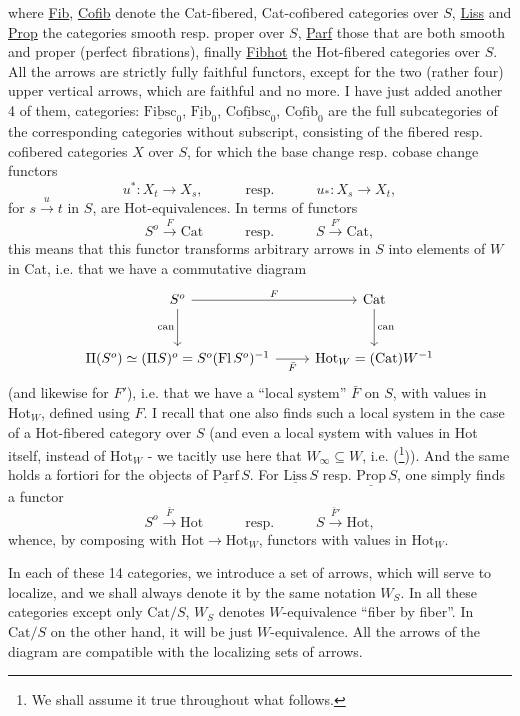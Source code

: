 \documentclass[11pt]{article}
\newcommand{\printedpage}[1]{\marginpar{\footnotesize p.~#1}}
\newcommand{\msp}[1]{\marginpar{\footnotesize [#1]}}
\newcommand{\ul}[1]{\underline{\mathrm{#1}}}
\begin{document}
\printedpage{5}
where \underline{Fib}, \underline{Cofib} denote the Cat-fibered, Cat-cofibered categories over $S$, \underline{Liss} and \underline{Prop} the categories
\msp{page 6}
smooth resp. proper over $S$, \underline{Parf} those that are both smooth and proper (perfect fibrations), finally \underline{Fibhot} the Hot-fibered categories over $S$. All the arrows are strictly fully faithful functors, except for the two (rather four) upper vertical arrows, which are faithful and no more. I have just added another 4 of them, categories: $\ul{Fibsc}_0$, $\ul{Fib}_0$, $\ul{Cofibsc}_0$, $\ul{Cofib}_0$ are the full subcategories of the corresponding categories without subscript, consisting of the fibered resp. cofibered categories $X$ over $S$, for which the base change resp. cobase change functors
\[
u^* : X_t \longrightarrow X_s, \qquad\quad \text{resp.} \qquad\quad u_* : X_s \longrightarrow X_t,
\]
for $s \xrightarrow{u} t$ in $S$, are Hot-equivalences. In terms of functors
\[
S^o \xrightarrow{F} \mathrm{Cat} \qquad\quad \text{resp.} \qquad\quad S \xrightarrow{F'} \mathrm{Cat},
\]
this means that this functor transforms arbitrary arrows in $S$ into elements of $W$ in Cat, i.e. that we have a commutative diagram
\[
\begin{tikzcd}[row sep=large]
S^o \arrow[r, "F"] \arrow[d, "\mathrm{can}"'] & \mathrm{Cat} \arrow[d, "\mathrm{can}"] \\
\Pi(S^o) \simeq (\Pi S)^o = S^o(\mathrm{Fl}\,S^o)^{-1} \arrow[r, "\bar F"'] & \mathrm{Hot}_W = (\mathrm{Cat})W^{-1}
\end{tikzcd}
\]
(and likewise for $F'$), i.e. that we have a ``local
\msp{page 7}
system'' $\bar F$ on $S$, with values in $\mathrm{Hot}_W$, defined using $F$. I recall that one also finds such a local system in the case of a Hot-fibered category over $S$ (and even a local system with values in Hot itself, instead of $\mathrm{Hot}_W$ - we tacitly use here that $W_\infty \subseteq W$, i.e.  (\footnote[5]{We shall assume it true throughout what follows.})). And the same holds a fortiori for the objects of $\ul{Parf}\,S$. For $\ul{Liss}\,S$ resp. $\ul{Prop}\,S$, one simply finds a functor
\[
S^o \xrightarrow{\bar F} \mathrm{Hot} \qquad\quad \text{resp.} \qquad\quad S \xrightarrow{\bar F'} \mathrm{Hot},
\]
whence, by composing with $\mathrm{Hot} \longrightarrow \mathrm{Hot}_W$, functors with values in $\mathrm{Hot}_W$.

In each of these 14 categories, we introduce a set of arrows, which will serve to localize, and we shall always denote it by the same notation $W_S$. In all these categories except only $\mathrm{Cat}/S$, $W_S$ denotes $W$-equivalence ``fiber by fiber''. In $\mathrm{Cat}/S$ on the other hand, it will be just $W$-equivalence. All the arrows of the diagram are compatible with the localizing sets of arrows.
\end{document}
